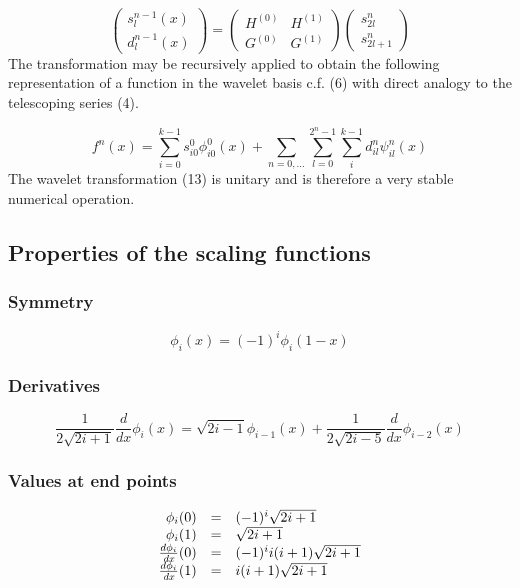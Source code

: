 \documentclass[letterpaper]{article}
\begin{document}
\begin{equation}
\left(\begin{matrix}s_{l}^{n-1}(x)\\d_{l}^{n-1}(x)\end{matrix}\right)=\left(\begin{matrix}H^{(0)}&H^{(1)}\\G^{(0)}&G^{(1)}\end{matrix}\right)\left(\begin{matrix}s_{2l}^{n}\\s_{2l+1}^{n}\end{matrix}\right)
\end{equation}
The transformation may be recursively applied to obtain the following representation of a function in the wavelet basis
c.f. (6) with direct analogy to the telescoping series (4).

\begin{equation}\label{seq:refText12}
f^{n}(x)=\sum _{i=0}^{k-1}s_{i0}^{0}\phi _{i0}^{0}(x)+\sum _{n=0,\ldots }\sum _{l=0}^{2^{n}-1}\sum
_{i}^{k-1}d_{il}^{n}\psi _{il}^{n}(x)
\end{equation}
The wavelet transformation (13) is unitary and is therefore a very stable numerical operation.

\subsection{Properties of the scaling functions}
\subsubsection{Symmetry}
\begin{equation}
\phi _{i}(x)=(-1)^{i}\phi _{i}(1-x)
\end{equation}
\subsubsection{Derivatives}
\begin{equation}
\frac{1}{2\sqrt{2i+1}}\frac{d}{\mathit{dx}}\phi _{i}(x)=\sqrt{2i-1}\phi
_{i-1}(x)+\frac{1}{2\sqrt{2i-5}}\frac{d}{\mathit{dx}}\phi _{i-2}(x)
\end{equation}
\subsubsection[Values at end points]{Values at end points}

\bigskip

\begin{equation}
\begin{matrix}\hfill \phi _{i}(0)&\text{=}&(-1)^{i}\sqrt{2i+1}\hfill\null \\\hfill \phi
_{i}(1)&\text{=}&\sqrt{2i+1}\hfill\null \\\hfill \frac{d\phi
_{i}}{\mathit{dx}}(0)&\text{=}&(-1)^{i}i(i+1)\sqrt{2i+1}\hfill\null \\\hfill \frac{d\phi
_{i}}{\mathit{dx}}(1)&\text{=}&i(i+1)\sqrt{2i+1}\hfill\null \end{matrix}
\end{equation}
\end{document}
